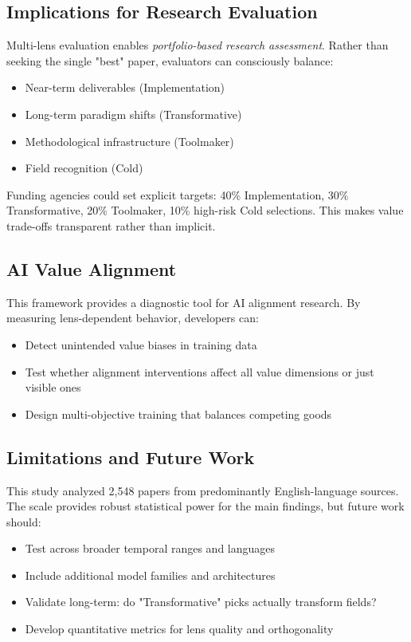 \documentclass{article}
\begin{document}
\subsection{Implications for Research Evaluation}

Multi-lens evaluation enables \textit{portfolio-based research assessment}. Rather than seeking the single "best" paper, evaluators can consciously balance:
\begin{itemize}
    \item Near-term deliverables (Implementation)
    \item Long-term paradigm shifts (Transformative)
    \item Methodological infrastructure (Toolmaker)
    \item Field recognition (Cold)
\end{itemize}

Funding agencies could set explicit targets: 40\% Implementation, 30\% Transformative, 20\% Toolmaker, 10\% high-risk Cold selections. This makes value trade-offs transparent rather than implicit.

\subsection{AI Value Alignment}

This framework provides a diagnostic tool for AI alignment research. By measuring lens-dependent behavior, developers can:
\begin{itemize}
    \item Detect unintended value biases in training data
    \item Test whether alignment interventions affect all value dimensions or just visible ones
    \item Design multi-objective training that balances competing goods
\end{itemize}

\subsection{Limitations and Future Work}

This study analyzed 2,548 papers from predominantly English-language sources. The scale provides robust statistical power for the main findings, but future work should:
\begin{itemize}
    \item Test across broader temporal ranges and languages
    \item Include additional model families and architectures
    \item Validate long-term: do "Transformative" picks actually transform fields?
    \item Develop quantitative metrics for lens quality and orthogonality
\end{itemize}
\end{document}
